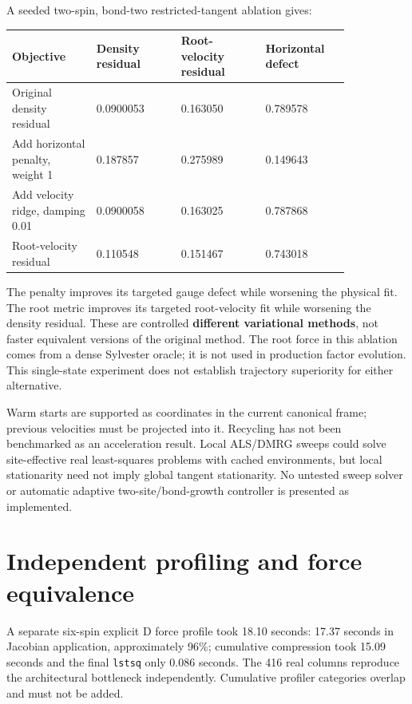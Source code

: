 \documentclass[10pt]{article}
\begin{document}
A seeded two-spin, bond-two restricted-tangent ablation gives:

\begingroup\small\setlength{\tabcolsep}{3pt}\begin{longtable}{p{0.21\linewidth}p{0.21\linewidth}p{0.21\linewidth}p{0.21\linewidth}}\toprule
Objective & Density residual & Root-velocity residual & Horizontal defect \\
\midrule\endhead
Original density residual & 0.0900053 & 0.163050 & 0.789578 \\
Add horizontal penalty, weight 1 & 0.187857 & 0.275989 & 0.149643 \\
Add velocity ridge, damping 0.01 & 0.0900058 & 0.163025 & 0.787868 \\
Root-velocity residual & 0.110548 & 0.151467 & 0.743018 \\
\bottomrule\end{longtable}\endgroup

The penalty improves its targeted gauge defect while worsening the physical
fit. The root metric improves its targeted root-velocity fit while worsening
the density residual. These are controlled \textbf{different variational methods},
not faster equivalent versions of the original method. The root force in this
ablation comes from a dense Sylvester oracle; it is not used in production
factor evolution. This single-state experiment does not establish trajectory
superiority for either alternative.

Warm starts are supported as coordinates in the current canonical frame;
previous velocities must be projected into it. Recycling has not been benchmarked
as an acceleration result. Local ALS/DMRG sweeps could solve site-effective real
least-squares problems with cached environments, but local stationarity need not
imply global tangent stationarity. No untested sweep solver or automatic
adaptive two-site/bond-growth controller is presented as implemented.

\section*{Independent profiling and force equivalence}

A separate six-spin explicit D force profile took 18.10 seconds: 17.37 seconds
in Jacobian application, approximately 96\%; cumulative compression took 15.09
seconds and the final \texttt{lstsq} only 0.086 seconds. The 416 real columns reproduce
the architectural bottleneck independently. Cumulative profiler categories
overlap and must not be added.
\end{document}
